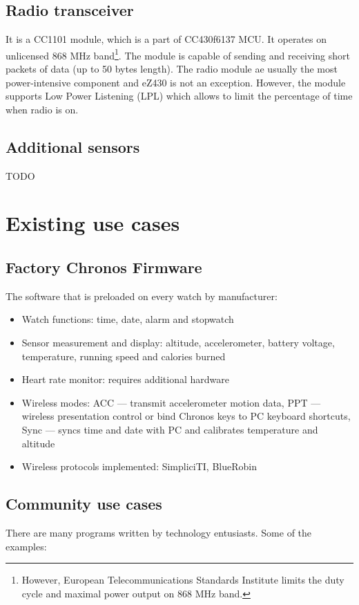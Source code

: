 \begin{commnet}
\subsection{Radio transceiver}

It is a CC1101 module, which is a part of CC430f6137 MCU.
It operates on unlicensed 868 MHz band\footnote{However, European Telecommunications Standards Institute limits the duty cycle and maximal power output on 868 MHz band.}.
The module is capable of sending and receiving short packets of data (up to 50 bytes length).
The radio module ae usually the most power-intensive component and eZ430 is not an exception.
However, the module supports Low Power Listening (LPL) which allows to limit the percentage of time when radio is on.

\subsection{Additional sensors}

TODO 

\section{Existing use cases}

\subsection{Factory Chronos Firmware}

The software that is preloaded on every watch by manufacturer:
\begin{itemize}
  \item Watch functions: time, date, alarm and stopwatch
  \item Sensor measurement and display: altitude, accelerometer, battery voltage, temperature, running speed and calories burned
  \item Heart rate monitor: requires additional hardware
  \item Wireless modes: ACC --- transmit accelerometer motion data, PPT --- wireless presentation control or bind Chronos keys to PC keyboard shortcuts, Sync --- syncs time and date with PC and calibrates temperature and altitude
  \item Wireless protocols implemented: SimpliciTI, BlueRobin
\end{itemize}

\subsection{Community use cases}
There are many programs written by technology entusiasts. Some of the examples:


\end{commnet}
